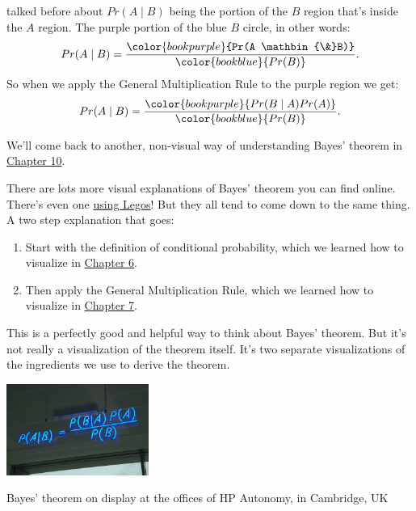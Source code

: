 \documentclass[justified]{tufte-book}
\providecommand{\tightlist}{%
  \setlength{\itemsep}{0pt}\setlength{\parskip}{0pt}}
\newcommand{\given}{\mid}
\renewcommand{\wedge}{\mathbin{\&}}
\newcommand{\p}{Pr}
\theoremstyle{definition}
\theoremstyle{definition}
\theoremstyle{definition}
\theoremstyle{definition}
\theoremstyle{remark}
\begin{document}
 talked before about \(\p(A \given B)\) being the portion of the \(B\) region that's inside the \(A\) region. The purple portion of the blue \(B\) circle, in other words:
\[
  \begin{aligned}
    \p(A \given B) &= \frac{ \color{bookpurple}{\p(A \wedge B)} }{ \color{bookblue}{\p(B)} }.\\
  \end{aligned}
\]
So when we apply the General Multiplication Rule to the purple region we get:
\[
  \begin{aligned}
    \p(A \given B) &= \frac{ \color{bookpurple}{\p(B \given A)\p(A)} }{ \color{bookblue}{\p(B)} }.\\
  \end{aligned}
\]

We'll come back to another, non-visual way of understanding Bayes' theorem in \protect\hyperlink{bayesibe}{Chapter 10}.

There are lots more visual explanations of Bayes' theorem you can find online. There's even one \href{https://www.countbayesie.com/blog/2015/2/18/bayes-theorem-with-lego}{using Legos}! But they all tend to come down to the same thing. A two step explanation that goes:

\begin{enumerate}
\def\labelenumi{\arabic{enumi}.}
\tightlist
\item
  Start with the definition of conditional probability, which we learned how to visualize in \protect\hyperlink{calculating-conditional-probability}{Chapter 6}.
\item
  Then apply the General Multiplication Rule, which we learned how to visualize in \protect\hyperlink{the-general-multiplication-rule}{Chapter 7}.
\end{enumerate}

This is a perfectly good and helpful way to think about Bayes' theorem. But it's not really a visualization of the theorem itself. It's two separate visualizations of the ingredients we use to derive the theorem.

\begin{marginfigure}
\includegraphics[width=1.83in]{img/neon_bayes} \caption[Bayes' theorem on display at the offices of HP Autonomy, in Cambridge, UK]{Bayes' theorem on display at the offices of HP Autonomy, in Cambridge, UK}\label{fig:neonbayes}
\end{marginfigure}
\end{document}

